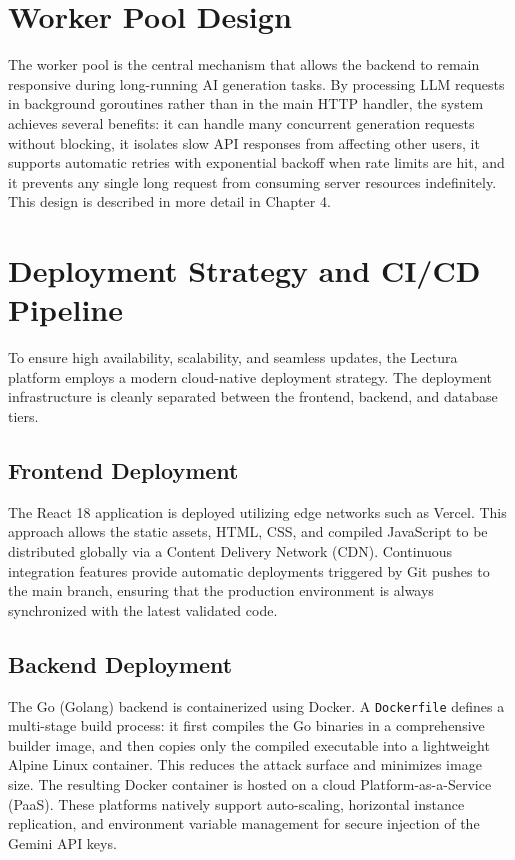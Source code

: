 \section{Worker Pool Design}
The worker pool is the central mechanism that allows the backend to remain responsive during long-running AI generation tasks. By processing LLM requests in background goroutines rather than in the main HTTP handler, the system achieves several benefits: it can handle many concurrent generation requests without blocking, it isolates slow API responses from affecting other users, it supports automatic retries with exponential backoff when rate limits are hit, and it prevents any single long request from consuming server resources indefinitely. This design is described in more detail in Chapter 4.

\section{Deployment Strategy and CI/CD Pipeline}
To ensure high availability, scalability, and seamless updates, the Lectura platform employs a modern cloud-native deployment strategy. The deployment infrastructure is cleanly separated between the frontend, backend, and database tiers.

\subsection{Frontend Deployment}
The React 18 application is deployed utilizing edge networks such as Vercel. This approach allows the static assets, HTML, CSS, and compiled JavaScript to be distributed globally via a Content Delivery Network (CDN). Continuous integration features provide automatic deployments triggered by Git pushes to the main branch, ensuring that the production environment is always synchronized with the latest validated code.

\subsection{Backend Deployment}
The Go (Golang) backend is containerized using Docker. A \texttt{Dockerfile} defines a multi-stage build process: it first compiles the Go binaries in a comprehensive builder image, and then copies only the compiled executable into a lightweight Alpine Linux container. This reduces the attack surface and minimizes image size. The resulting Docker container is hosted on a cloud Platform-as-a-Service (PaaS). These platforms natively support auto-scaling, horizontal instance replication, and environment variable management for secure injection of the Gemini API keys.

